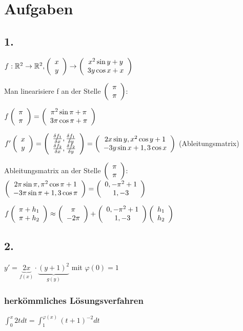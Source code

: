 \renewcommand{\ldate}{2016-01-08}

\section{Aufgaben}

\subsection{1.}
$f: \R^2 \rightarrow \R^2, \vektor{x\\y} \rightarrow \vektor{x^2 \sin y + y\\3y\cos x + x}$

Man linearisiere f an der Stelle $\vektor{\pi\\\pi}$:

$ f\vektor{\pi\\\pi} = \vektor{\pi^2 \sin \pi + \pi\\3\pi\cos \pi + \pi} $

$ f'\vektor{x\\y} = \vektor{\frac{\df_1}{\dx}, \frac{\df_1}{\dy}\\\frac{\df_2}{\dx}, \frac{\df_2}{\dy}} 
= \vektor{2x\sin y, x^2\cos y + 1\\ - 3 y \sin x + 1, 3 \cos x}$ (Ableitungsmatrix)

Ableitungsmatrix an der Stelle $\vektor{\pi\\\pi}$:
$ \vektor{2\pi\sin \pi, \pi^2\cos \pi + 1\\ - 3 \pi \sin \pi + 1, 3 \cos \pi} 
= \vektor{0, -\pi^2 + 1\\1, -3}$

$ f\vektor{\pi + h_1\\\pi + h_2} \approx \vektor{\pi\\-2\pi} + \vektor{0, -\pi^2 + 1\\1, -3} \vektor{h_1\\h_2} $

\subsection{2.}
$ y' = \underbrace{2x}_{f(x)} \cdot \underbrace{(y+1)^2}_{g(y)}$ mit $\varphi(0) = 1$

\subsubsection{herkömmliches Lösungsverfahren}
$ \int_{0}^{x} 2t dt = \int_{1}^{\varphi(x)} (t+1)^{-2} dt $ 

